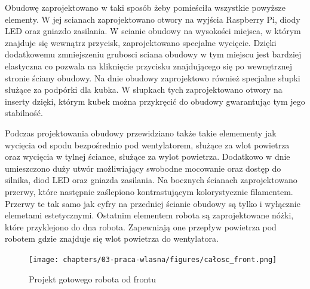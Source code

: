 Obudowę zaprojektowano w taki sposób żeby pomieściła wszystkie powyższe elementy. W jej scianach zaprojektowano otwory na wyjścia Raspberry Pi, 
diody LED oraz gniazdo zasilania. W scianie obudowy na wysokości miejsca, w którym znajduje się wewnątrz przycisk, zaprojektowano specjalne wycięcie.
Dzięki dodatkowemu zmniejszeniu grubosci sciana obudowy w tym miejscu jest bardziej elastyczna co pozwala na kliknięcie przycisku znajdującego
się po wewnętrznej stronie ściany obudowy. Na dnie obudowy zaprojektowo również specjalne słupki służące za podpórki dla kubka. 
W słupkach tych zaprojektowano otwory na inserty dzięki, którym kubek można przykręcić do obudowy gwarantując tym jego stabilność.

Podczas projektowania obudowy przewidziano także takie elemementy jak wycięcia od spodu bezpośrednio pod wentylatorem, służące za wlot powietrza 
oraz wycięcia w tylnej ściance, służące za wylot powietrza. Dodatkowo w dnie umieszczono duży utwór możliwiający swobodne mocowanie oraz dostęp do 
silnika, diod LED oraz gniazda zasilania. Na bocznych ścianach zaprojektowano przerwy, które następnie zaślepiono kontrastującym kolorystycznie filamentem.
Przerwy te tak samo jak cyfry na przedniej ścianie obudowy są tylko i wyłącznie elemetami estetycznymi. Ostatnim elementem robota są zaprojektowane nóżki, 
które przyklejono do dna robota. Zapewniają one przepływ powietrza pod robotem gdzie znajduje się wlot powietrza do wentylatora.

\begin{figure}[H]
    \centering
    \texttt{[image: chapters/03-praca-wlasna/figures/całosc\_front.png]}
    \caption{\label{fig:gotowy}Projekt gotowego robota od frontu}
\end{figure}